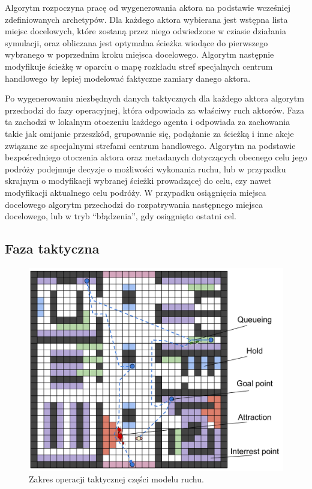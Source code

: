\documentclass[a4paper, 12pt]{article}
\begin{document}

Algorytm rozpoczyna pracę od wygenerowania aktora na podstawie wcześniej zdefiniowanych archetypów.
Dla każdego aktora wybierana jest wstępna lista miejsc docelowych, które zostaną przez niego odwiedzone w cziasie działania symulacji, oraz obliczana jest optymalna ścieżka wiodące do pierwszego wybranego w poprzednim kroku miejsca docelowego. Algorytm następnie modyfikuje ścieżkę w oparciu o mapę rozkładu stref specjalnych centrum handlowego by lepiej modelować faktyczne zamiary danego aktora.

Po wygenerowaniu niezbędnych danych taktycznych dla każdego aktora algorytm przechodzi do fazy operacyjnej, która odpowiada za właściwy ruch aktorów. Faza ta zachodzi w lokalnym otoczeniu każdego agenta i odpowiada za zachowania takie jak omijanie przeszkód, grupowanie się, podążanie za ścieżką i inne akcje związane ze specjalnymi strefami centrum handlowego.
Algorytm na podstawie bezpośredniego otoczenia aktora oraz metadanych dotyczących obecnego celu jego podróży podejmuje decyzje o możliwości wykonania ruchu, lub w przypadku skrajnym o modyfikacji wybranej ścieżki prowadzącej do celu, czy nawet modyfikacji aktualnego celu podróży.
W przypadku osiągnięcia miejsca docelowego algorytm przechodzi do rozpatrywania następnego miejsca docelowego, lub w tryb ``błądzenia'', gdy osiągnięto ostatni cel.

\newpage
        \subsection{Faza taktyczna}
        \label{sec:tactical}

        \begin{figure}[h!]
            \centering
            \includegraphics[scale=0.3]{./img/Tactical.pdf}
            \caption{Zakres operacji taktycznej części modelu ruchu.}
            \label{fig:tactical}
        \end{figure}
\end{document}
